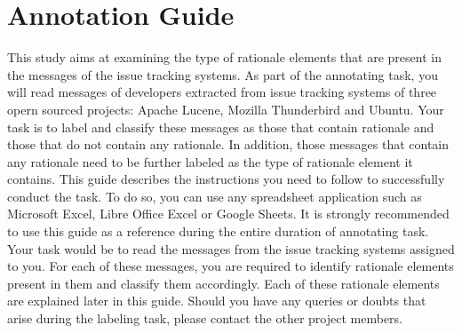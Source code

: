 \documentclass[a4paper,12pt,twoside]{report}
\begin{document}
\chapter{Annotation Guide}
This study aims at examining the type of rationale elements that are present in the messages of the issue tracking systems.
\bigbreak 
As part of the annotating task, you will read messages of developers extracted from issue tracking systems of three opern sourced projects: Apache Lucene, Mozilla Thunderbird and Ubuntu. Your task is to label and classify these messages as those that contain rationale and those that do not contain any rationale. In addition, those messages that contain any rationale need to be further labeled as the type of rationale element it contains. 
\bigbreak
This guide describes the instructions you need to follow to successfully conduct the task. To do so, you can use any spreadsheet application such as Microsoft Excel, Libre Office Excel or Google Sheets. It is strongly recommended to use this guide as a reference during the entire duration of annotating task. 
\bigbreak
Your task would be to read the messages from the issue tracking systems assigned to you. For each of these messages, you are required to identify rationale elements present in them and classify them accordingly. Each of these rationale elements are explained later in this guide. 
\bigbreak
Should you have any queries or doubts that arise during the labeling task, please contact the other project members. 
\end{document}
